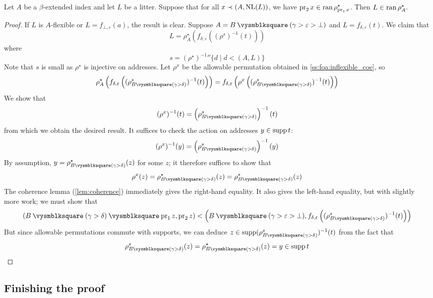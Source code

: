 \begin{lemma}
    Let \( A \) be a \( \beta \)-extended index and let \( L \) be a litter.
    Suppose that for all \( x \prec (A, \operatorname{NL}(L)) \), we have \( \operatorname{pr}_2 x \in \operatorname{ran} \rho^\star_{\operatorname{pr}_1 x} \).
    Then \( L \in \operatorname{ran} \rho^\star_A \).
\end{lemma}
\begin{proof}
    If \( L \) is \( A \)-flexible or \( L = f_{\bot,\varepsilon}(a) \), the result is clear.
    Suppose \( A = B \pcomp (\gamma > \varepsilon > \bot) \) and \( L = f_{\delta,\varepsilon}(t) \).
    We claim that
    \[ L = \rho^\star_A(f_{\delta,\varepsilon}((\rho^s)^{-1}(t))) \]
    where
    \[ s = {(\rho^\star)^{-1}} '' \{ d \mid d < (A, L) \} \]
    Note that \( s \) is small as \( \rho^\star \) is injective on addresses.
    Let \( \rho^x \) be the allowable permutation obtained in \cref{ss:foa:inflexible_coe}, so
    \[ \rho^\star_A\left(f_{\delta,\varepsilon}\left((\rho^s_{B \pcomp (\gamma > \delta)})^{-1}(t)\right)\right) = f_{\delta,\varepsilon}\left(\rho^x\left((\rho^s_{B \pcomp (\gamma > \delta)})^{-1}(t)\right)\right) \]
    We show that
    \[ (\rho^x)^{-1}(t) = \left(\rho^s_{B \pcomp (\gamma > \delta)}\right)^{-1}(t) \]
    from which we obtain the desired result.
    It suffices to check the action on addresses \( y \in \operatorname{supp} t \):
    \[ (\rho^x)^{-1}(y) = \left(\rho^s_{B \pcomp (\gamma > \delta)}\right)^{-1}(y) \]
    By assumption, \( y = \rho^\star_{B \pcomp (\gamma > \delta)}(z) \) for some \( z \); it therefore suffices to show that
    \[ \rho^x(z) = \rho^\star_{B \pcomp (\gamma > \delta)}(z) = \rho^s_{B \pcomp (\gamma > \delta)}(z) \]
    The coherence lemma (\cref{lem:coherence}) immediately gives the right-hand equality.
    It also gives the left-hand equality, but with slightly more work; we must show that
    \[ (B \pcomp (\gamma > \delta) \pcomp \pr_1 z, \pr_2 z) < \left(B \pcomp (\gamma > \varepsilon > \bot), f_{\delta,\varepsilon}\left((\rho^s_{B \pcomp (\gamma > \delta)})^{-1}(t)\right)\right) \]
    But since allowable permutations commute with supports, we can deduce \( z \in \supp (\rho^s_{B \pcomp (\gamma > \delta)})^{-1}(t) \) from the fact that
    \[ \rho^s_{B \pcomp (\gamma > \delta)}(z) = \rho^\star_{B \pcomp (\gamma > \delta)}(z) = y \in \supp t \]
\end{proof}

\subsection{Finishing the proof}


